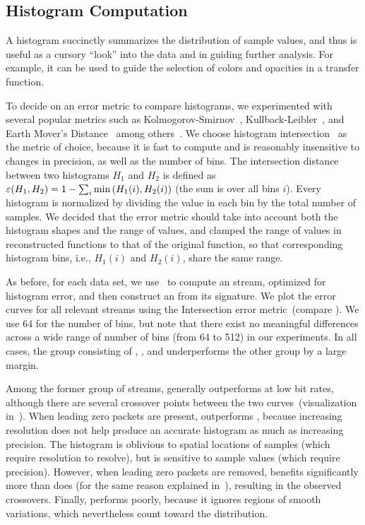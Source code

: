 \subsection{Histogram Computation}\label{sec:histogram}

A histogram succinctly summarizes the distribution of sample values, and thus is useful as a cursory
``look'' into the data and in guiding further analysis. For example, it can be used to guide the
selection of colors and opacities in a transfer function.

To decide on an error metric to compare histograms, we experimented with several popular metrics
such as Kolmogorov-Smirnov~\cite{smirnov1948}, Kullback-Leibler~\cite{kullback1951}, and Earth
Mover's Distance~\cite{emd1998} among others~\cite{Hellinger1909,Bhattacharyya1943}. We choose
histogram intersection~\cite{histogram_intersection1991} as the metric of choice, because it is fast
to compute and is reasonably insensitive to changes in precision, as well as the number of bins. The
intersection distance between two histograms $H_1$ and $H_2$ is defined as
$\err(H_1,H_2)=1-\sum_{i}{\min{(H_1(i),H_2(i))}}$ (the sum is over all bins $i$). Every histogram is
normalized by dividing the value in each bin by the total number of samples. We decided that the
error metric should take into account both the histogram shapes and the range of values, and clamped
the range of values in reconstructed functions to that of the original function, so that
corresponding histogram bins, i.e., $H_1(i)$ and $H_2(i)$, share the same range.

As before, for each data set, we use~ to compute an \shop stream, optimized for
histogram error, and then construct an \shsg from its signature. We plot the error curves for all
relevant streams using the Intersection error metric~(compare
). We use 64 for the number of bins, but note that there exist
no meaningful differences across a wide range of number of bins (from 64 to 512) in our experiments.
In all cases, the group consisting of \sbit, \slvl, and \smag underperforms the other group by a
large margin.

Among the former group of streams, \slvl generally outperforms \sbit at low bit rates, although
there are several crossover points between the two curves~(visualization
in~). When leading zero packets are present, \slvl outperforms \sbit,
because increasing resolution does not help produce an accurate histogram as much as increasing
precision. The histogram is oblivious to spatial locations of samples (which require resolution to
resolve), but is sensitive to sample values (which require precision). However, when leading zero
packets are removed, \sbit benefits significantly more than \slvl does (for the same reason
explained in~), resulting in the observed crossovers. Finally, \smag
performs poorly, because it ignores regions of smooth variations, which nevertheless count toward
the distribution.

